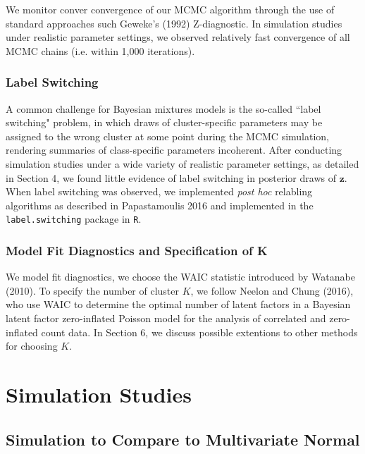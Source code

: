 \documentclass[useAMS,referee]{biom}
\begin{document}
We monitor conver convergence of our MCMC algorithm through the use of standard approaches such Geweke's (1992) Z-diagnostic. In simulation studies under realistic parameter settings, we observed relatively fast convergence of all MCMC chains (i.e. within 1,000 iterations).

\subsubsection{Label Switching}

A common challenge for Bayesian mixtures models is the so-called ``label switching" problem, in which draws of cluster-specific parameters may be assigned to the wrong cluster at some point during the MCMC simulation, rendering summaries of class-specific parameters incoherent. After conducting simulation studies under a wide variety of realistic parameter settings, as detailed in Section 4, we found little evidence of label switching in posterior draws of $\mathbf{z}$. When label switching was observed, we implemented \textit{post hoc} relabling algorithms as described in Papastamoulis 2016 and implemented in the \texttt{label.switching} package in \texttt{R}.

\subsubsection{Model Fit Diagnostics and Specification of K}

We model fit diagnostics, we choose the WAIC statistic introduced by Watanabe (2010). To specify the number of cluster $K$, we follow Neelon and Chung (2016), who use WAIC to determine the optimal number of latent factors in a Bayesian latent factor zero-inflated Poisson model for the analysis of correlated and zero-inflated count data. In Section 6, we discuss possible extentions to other methods for choosing $K$.

\newpage

\section{Simulation Studies}
\label{s:sim}

\subsection{Simulation to Compare to Multivariate Normal}
\end{document}
